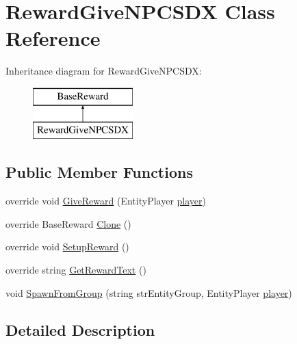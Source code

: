 \hypertarget{class_reward_give_n_p_c_s_d_x}{}\section{Reward\+Give\+N\+P\+C\+S\+DX Class Reference}
\label{class_reward_give_n_p_c_s_d_x}
Inheritance diagram for Reward\+Give\+N\+P\+C\+S\+DX\+:\begin{figure}[H]
\begin{center}
\leavevmode
\includegraphics[height=2.000000cm]{d2/d79/class_reward_give_n_p_c_s_d_x}
\end{center}
\end{figure}
\subsection*{Public Member Functions}
\begin{DoxyCompactItemize}
\item 
override void \mbox{\hyperlink{class_reward_give_n_p_c_s_d_x_ac25cf8c7da450ff19403ac2be58d40cd}{Give\+Reward}} (Entity\+Player \mbox{\hyperlink{_sphere_i_i_01_music_01_boxes_2_config_2_localization_8txt_a4e2cb8aeff651600ea1cc57fe5a929a4}{player}})
\item 
override Base\+Reward \mbox{\hyperlink{class_reward_give_n_p_c_s_d_x_a6f05c8061604c9402ffe4687b3647e29}{Clone}} ()
\item 
override void \mbox{\hyperlink{class_reward_give_n_p_c_s_d_x_a35c70f880e1e1e3e388cb1d910490cf2}{Setup\+Reward}} ()
\item 
override string \mbox{\hyperlink{class_reward_give_n_p_c_s_d_x_a63788494596222b338f91a4c4e643ef7}{Get\+Reward\+Text}} ()
\item 
void \mbox{\hyperlink{class_reward_give_n_p_c_s_d_x_aa22d3c6f10499f3f740897ec11f62237}{Spawn\+From\+Group}} (string str\+Entity\+Group, Entity\+Player \mbox{\hyperlink{_sphere_i_i_01_music_01_boxes_2_config_2_localization_8txt_a4e2cb8aeff651600ea1cc57fe5a929a4}{player}})
\end{DoxyCompactItemize}


\subsection{Detailed Description}


